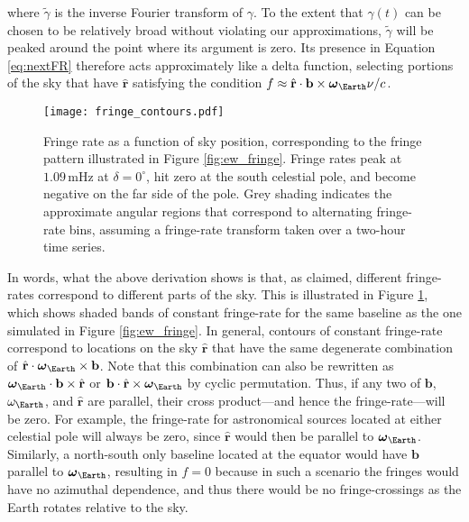 \documentclass[twocolumn,apj,numberedappendix]{emulateapj}
\newcommand{\rhat}{\hat{\mathbf{r}}}
\begin{document}
where $\tilde{\gamma}$ is the inverse Fourier transform of $\gamma$. To the extent that $\gamma(t)$ can be chosen to be relatively broad without violating our approximations, $\tilde{\gamma}$ will be peaked around the point where its argument is zero. Its presence in Equation \eqref{eq:nextFR} therefore acts approximately like a delta function, selecting portions of the sky that have $\rhat$ satisfying the condition $f \approx \rhat \cdot \mathbf{b} \times \boldsymbol \omega_\Earth \nu / c $.

\begin{figure}\centering
\texttt{[image: fringe\_contours.pdf]}
\caption{
Fringe rate as a function of sky position, corresponding to the fringe pattern illustrated in
Figure \ref{fig:ew_fringe}.  Fringe rates peak at $1.09\,\textrm{mHz}$ at $\delta=0^\circ$, hit zero at
the south celestial pole, and become negative on the far side of the pole.  Grey shading indicates
the approximate angular regions that correspond to alternating fringe-rate bins, assuming a
fringe-rate transform taken over a two-hour time series.
}\label{fig:fringe_contours}
\end{figure}

In words, what the above derivation shows is that, as claimed, different fringe-rates correspond to different parts of the sky. This is illustrated in Figure \ref{fig:fringe_contours}, which shows shaded bands of constant fringe-rate for the same baseline as the one simulated in Figure \ref{fig:ew_fringe}. In general, contours of constant fringe-rate correspond to locations on the sky $\rhat$ that have the same degenerate combination of $\rhat \cdot \boldsymbol \omega_\Earth \times \mathbf{b} $. Note that this combination can also be rewritten as $\boldsymbol \omega_\Earth \cdot \mathbf{b} \times \rhat $ or $\mathbf{b} \cdot \rhat \times  \boldsymbol \omega_\Earth $ by cyclic permutation. Thus, if any two of $\mathbf{b}$, $\omega_\Earth$, and $\rhat$ are parallel, their cross product---and hence the fringe-rate---will be zero. For example, the fringe-rate for astronomical sources located at either celestial pole will always be zero, since $\rhat$ would then be parallel to $\boldsymbol \omega_\Earth$. Similarly, a north-south only baseline located at the equator would have $\mathbf{b}$ parallel to $\boldsymbol \omega_\Earth$, resulting in $f=0$ because in such a scenario the fringes would have no azimuthal dependence, and thus there would be no fringe-crossings as the Earth rotates relative to the sky.
\end{document}
